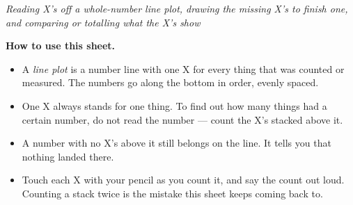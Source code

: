 \documentclass[12pt]{article}
\begin{document}
\newlength{\figcol}\setlength{\figcol}{0.50\linewidth}
\newlength{\qcol}\setlength{\qcol}{0.46\linewidth}

\begin{center}\small\textit{Reading X's off a whole-number line plot, drawing the missing
X's to finish one, and comparing or totalling what the X's show}\end{center}

\noindent\small\textbf{How to use this sheet.}
\begin{itemize}[label={$\bullet$}, leftmargin=1.1cm, itemsep=1pt, topsep=2pt]
  \item A \emph{line plot} is a number line with one \textsf{X} for every thing that was
        counted or measured. The numbers go along the bottom in order, evenly spaced.
  \item One \textsf{X} always stands for one thing. To find out how many things had a
        certain number, do not read the number --- count the \textsf{X}'s stacked above it.
  \item A number with no \textsf{X}'s above it still belongs on the line. It tells you that
        nothing landed there.
  \item Touch each \textsf{X} with your pencil as you count it, and say the count out loud.
        Counting a stack twice is the mistake this sheet keeps coming back to.
\end{itemize}
\normalsize

\bigskip

\end{document}
